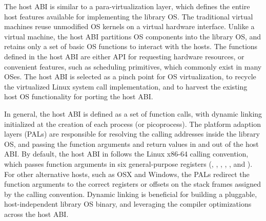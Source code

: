 The host ABI is similar to a para-virtualization layer, which defines the entire host features
available for implementing the library OS.
The traditional virtual machines reuse unmodified OS kernels on a virtual hardware interface.
Unlike a virtual machine,
the host ABI partitions OS components into the library OS, and retains only a set of basic OS functions to interact with the hosts.
The functions defined in the host ABI
are either API for requesting hardware resources, or convenient features, such as scheduling primitives, which commonly exist in many OSes.
The host ABI is selected as a pinch point for OS virtualization,
to recycle the virtualized Linux system call implementation, and to harvest the existing host OS functionality for porting the host ABI. 




In general, the host ABI is defined as a set of function calls, with dynamic linking initialized at the creation of each process (or picoprocess).
The platform adaption layers (PALs)
are responsible for
resolving the calling addresses inside the library OS, and passing the function arguments and return values in and out of the host ABI.
By default, the host ABI in \graphene{} follows the Linux x86-64 calling convention,
which passes function arguments in six general-purpose registers (, , , , , and ).
For other alternative hosts,
such as OSX and Windows, the PALs redirect
the function arguments to the correct registers or offsets on the stack frames assigned by the calling convention.
Dynamic linking is beneficial for
building a pluggable, host-independent library OS binary, and leveraging the compiler optimizations across the host ABI.









